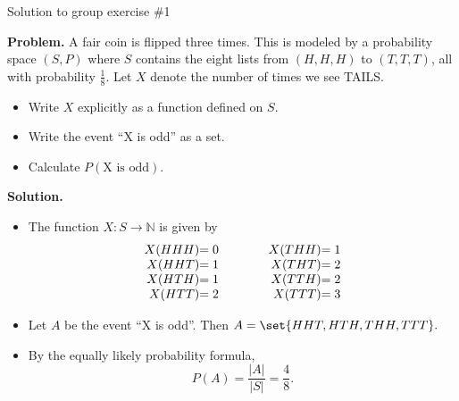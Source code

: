 \documentclass[10pt]{beamer}
\begin{document}
\begin{frame}{Solution to group exercise \#1}

\textbf{Problem.} A fair coin is flipped three times. This is modeled by a probability space $(S,P)$ where $S$ contains the eight lists from $(H,H,H)$ to $(T,T,T)$, all with probability $\frac{1}{8}$.  Let $X$ denote the number of times we see TAILS.
	\begin{itemize} \footnotesize 
	\item[a.] Write $X$ explicitly as a function defined on $S$.
	\item[b.] Write the event \enquote{X is odd} as a set.
	\item[c.] Calculate $P(\text{X is odd})$.
	\end{itemize}
\vfill 

\textbf{Solution.} 
	\begin{itemize} \small
	\item[a.]  The function $X: S \to \mathbb{N}$ is given by
	\[\begin{array}{r@{}lcr@{}l}
	X(HHH) &= 0 &\qquad & X(THH) &=1 \\
	X(HHT) &= 1 &\qquad & X(THT) &=2 \\
	X(HTH) &= 1 &\qquad & X(TTH) &=2 \\
	X(HTT) &= 2 &\qquad & X(TTT) &=3 \\
	\end{array}\]
	\item[b.] Let $A$ be the event \enquote{X is odd}.  Then $A=\set{HHT, HTH, THH, TTT}.$
	\item[c.] By the equally likely probability formula,
	\[ P(A) = \frac{|A|}{|S|}  = \frac{4}{8}. \]
	\end{itemize}
\vfill 
\end{frame}
\end{document}
